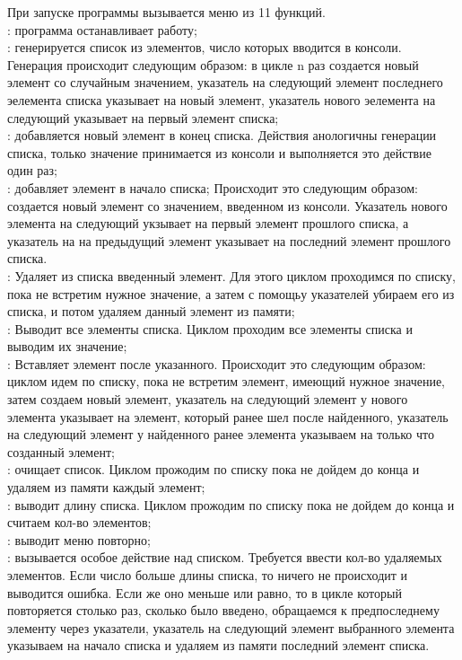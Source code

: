 \begin{spacing}{1}

\indent При запуске программы вызывается меню из 11 функций.\\
: программа останавливает работу;\\
: генерируется список из элементов, число которых вводится в консоли. 
Генерация происходит следующим образом: в цикле n раз создается новый элемент со случайным значением, 
указатель на следующий элемент последнего эелемента списка указывает на новый элемент, 
указатель нового эелемента на следующий указывает на первый элемент списка;\\
: добавляется новый элемент в конец списка. Действия анологичны генерации списка, только 
значение принимается из консоли и выполняется это действие один раз;\\
: добавляет элемент в начало списка; Происходит это следующим образом: 
создается новый элемент со значением, введенном из консоли. 
Указатель нового элемента на следующий укзывает на первый элемент прошлого списка, 
а указатель на на предыдущий элемент указывает на последний элемент прошлого списка.\\
: Удаляет из списка введенный элемент. Для этого циклом проходимся по списку, 
пока не встретим нужное значение, а затем с помощьу указателей убираем его из списка, и потом 
удаляем данный элемент из памяти;\\
: Выводит все элементы списка. Циклом проходим все элементы списка и выводим их значение;\\
: Вставляет элемент после указанного. Происходит это следующим образом: 
циклом идем по списку, пока не встретим элемент, имеющий нужное значение, 
затем создаем новый элемент, указатель на следующий элемент у нового элемента указывает на элемент, 
который ранее шел после найденного, указатель на следующий элемент у найденного ранее элемента 
указываем на только что созданный элемент;\\
: очищает список. Циклом прожодим по списку пока не дойдем до конца и удаляем из памяти каждый элемент;\\
: выводит длину списка. Циклом прожодим по списку пока не дойдем до конца и считаем кол-во элементов;\\
: выводит меню повторно;\\
: вызывается особое действие над списком. Требуется ввести кол-во удаляемых элементов. 
Если число больше длины списка, то ничего не происходит и выводится ошибка. Если же оно меньше или равно, 
то в цикле который повторяется столько раз, сколько было введено, обращаемся к предпоследнему элементу через указатели,
указатель на следующий элемент выбранного элемента указываем на начало списка и удаляем из памяти последний элемент списка.\\


\end{spacing}